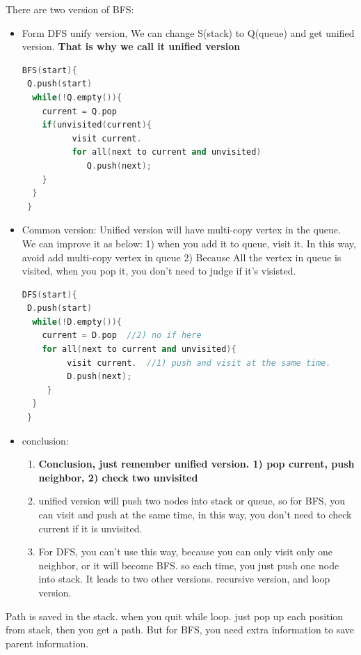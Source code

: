 \documentclass[a4paper,11pt,twoside]{book}
\begin{document}
\par There are two version of BFS:
\begin{itemize}
\item Form DFS unify version, We can change S(stack) to Q(queue) and get unified version. \textbf{That is why we call it unified version}
\begin{lstlisting}[frame=single, language=c++]
BFS(start){
 Q.push(start)  
  while(!Q.empty()){
    current = Q.pop
    if(unvisited(current){
          visit current.
          for all(next to current and unvisited)
             Q.push(next);
    }
  }
 }
\end{lstlisting} 

\item Common version:  Unified version will have multi-copy vertex in the queue. We can improve it as below:  1) when you add it to queue, visit it. In this way, avoid add multi-copy vertex in queue 2) Because All the vertex in queue is visited, when you pop it, you don't need to judge if it's visisted. 
\begin{lstlisting}[frame=single, language=c++]
DFS(start){
 D.push(start)  
  while(!D.empty()){
    current = D.pop  //2) no if here
    for all(next to current and unvisited){
         visit current.  //1) push and visit at the same time. 
         D.push(next);
     }
  }
 }
\end{lstlisting} 

\item conclusion:
\begin{enumerate}
	
\item  \textbf{Conclusion, just remember unified version. 1) pop current, push neighbor, 2) check two unvisited}
\item unified version will push two nodes into stack or queue, so for BFS, you can visit and push at the same time, in this way, you don't need to check current if it is unvisited. 

\item For DFS, you can't use this way, because you can only visit only one neighbor, or it will become BFS. so each time, you just push one node into stack. It leads to two other versions. recursive version, and loop version. 
\end{enumerate}


\end{itemize}

	\par Path is saved in the stack.  when you quit while loop. just pop up each position from stack, then you get a path. But for BFS, you need extra information to save parent information. 
\end{document}
